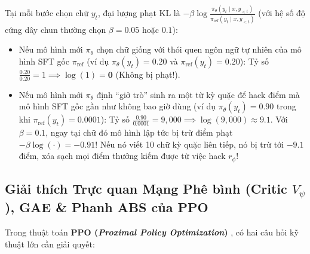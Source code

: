 \begin{mathdecode}
Tại mỗi bước chọn chữ $y_t$, đại lượng phạt KL là $-\beta \log \frac{\pi_\theta(y_t \mid x, y_{<t})}{\pi_{\text{ref}}(y_t \mid x, y_{<t})}$ (với hệ số độ cứng dây chun thường chọn $\beta = 0.05$ hoặc $0.1$):
\begin{itemize}[leftmargin=1.2cm]
    \item Nếu mô hình mới $\pi_\theta$ chọn chữ giống với thói quen ngôn ngữ tự nhiên của mô hình SFT gốc $\pi_{\text{ref}}$ (ví dụ $\pi_\theta(y_t) = 0.20$ và $\pi_{\text{ref}}(y_t) = 0.20$): Tỷ số $\frac{0.20}{0.20} = 1 \implies \log(1) = \mathbf{0}$ (Không bị phạt!).
    \item Nếu mô hình mới $\pi_\theta$ định ``giở trò'' sinh ra một từ kỳ quặc để hack điểm mà mô hình SFT gốc gần như không bao giờ dùng (ví dụ $\pi_\theta(y_t) = 0.90$ trong khi $\pi_{\text{ref}}(y_t) = 0.0001$):
    Tỷ số $\frac{0.90}{0.0001} = 9,000 \implies \log(9,000) \approx 9.1$. Với $\beta = 0.1$, ngay tại chữ đó mô hình lập tức bị trừ điểm phạt $-\beta \log(\cdot) = \mathbf{-0.91}$! Nếu nó viết 10 chữ kỳ quặc liên tiếp, nó bị trừ tới $\mathbf{-9.1}$ điểm, xóa sạch mọi điểm thưởng kiếm được từ việc hack $r_\phi$!
\end{itemize}
\end{mathdecode}

\subsection{Giải thích Trực quan Mạng Phê bình (Critic $V_\psi$), GAE \& Phanh ABS của PPO}
Trong thuật toán \textbf{PPO (\textit{Proximal Policy Optimization})} \citep{schulman2017proximal}, có hai câu hỏi kỹ thuật lớn cần giải quyết:


